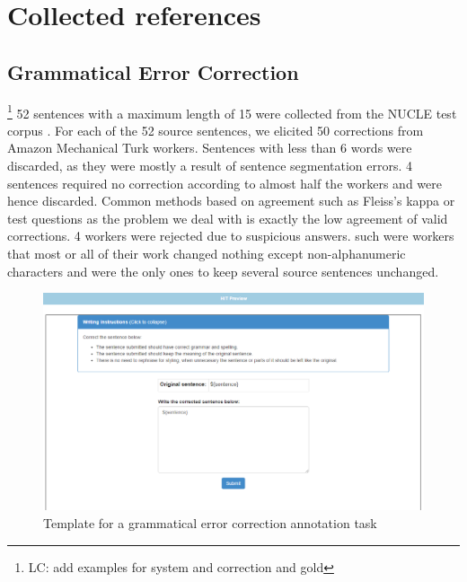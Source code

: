 \documentclass[letterpaper, 11pt]{article}
\newcommand{\lc}[1]{\footnote{\color{blue}LC: #1}}
\begin{document}
\section{Collected references}\label{ap:crowd}
\subsection{Grammatical Error Correction}
\lc{add examples for system and correction and gold}
52 sentences with a maximum length of 15 were collected from the NUCLE test corpus \cite{dahlmeier2013building}. 
For each of the 52 source sentences, 
we elicited 50 corrections from Amazon Mechanical Turk workers.
Sentences with less than 6 words were discarded, as they were mostly a result of sentence segmentation errors.
4 sentences required no correction according to almost half the workers and were hence discarded.
Common methods based on agreement such as Fleiss's kappa or test questions as the problem we deal with is exactly the low agreement of valid corrections.
4 workers were rejected due to suspicious answers. such were workers that most or all of their work changed nothing except non-alphanumeric characters and were the only ones to keep several source sentences unchanged. 

\begin{figure}[htb]
	\includegraphics[width=0.9\columnwidth]{correction_task}
	\caption{Template for a grammatical error correction annotation task} 
\end{figure}
\end{document}
